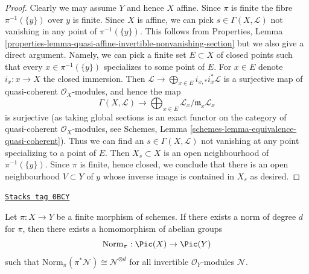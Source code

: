 \begin{proof}
Clearly we may assume $Y$ and hence $X$ affine. Since $\pi$ is finite the
fibre $\pi^{-1}(\{y\})$ over $y$ is finite.
Since $X$ is affine, we can pick $s \in \Gamma(X, \mathcal{L})$
not vanishing in any point of $\pi^{-1}(\{y\})$. This follows
from Properties, Lemma
\ref{properties-lemma-quasi-affine-invertible-nonvanishing-section}
but we also give a direct argument. Namely, we can
pick a finite set $E \subset X$ of closed points such that
every $x \in \pi^{-1}(\{y\})$ specializes to some point of $E$.
For $x \in E$ denote $i_x : x \to X$ the closed immersion.
Then
$\mathcal{L} \to \bigoplus_{x \in E} i_{x, *}i_x^*\mathcal{L}$
is a surjective map of quasi-coherent $\mathcal{O}_X$-modules,
and hence the map
$$
\Gamma(X, \mathcal{L}) \to
\bigoplus\nolimits_{x \in E} \mathcal{L}_x/\mathfrak m_x\mathcal{L}_x
$$
is surjective (as taking global sections is an exact functor on the
category of quasi-coherent $\mathcal{O}_X$-modules, see
Schemes, Lemma \ref{schemes-lemma-equivalence-quasi-coherent}).
Thus we can find an $s \in \Gamma(X, \mathcal{L})$
not vanishing at any point specializing to a point of $E$.
Then $X_s \subset X$ is an open neighbourhood of $\pi^{-1}(\{y\})$.
Since $\pi$ is finite, hence closed, we conclude that there is an
open neighbourhood $V \subset Y$ of $y$ whose inverse image
is contained in $X_s$ as desired.
\end{proof}

\begin{lemma}
\label{divisors-lemma-norm-invertible}
\href{https://stacks.math.columbia.edu/tag/0BCY}{\texttt{Stacks tag 0BCY}}

Let $\pi : X \to Y$ be a finite morphism of schemes. If there exists
a norm of degree $d$ for $\pi$, then there exists a homomorphism of
abelian groups
$$
\text{Norm}_\pi : \Pic(X) \to \Pic(Y)
$$
such that $\text{Norm}_\pi(\pi^*\mathcal{N}) \cong \mathcal{N}^{\otimes d}$
for all invertible $\mathcal{O}_Y$-modules $\mathcal{N}$.
\end{lemma}

